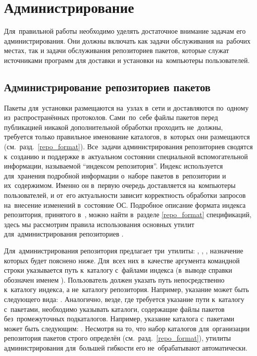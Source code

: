 
\section{Администрирование \ds}

Для~правильной работы \ds необходимо уделять достаточное внимание задачам его администрирования.
Они должны включать как задачи обслуживания \ds на~рабочих местах, так и задачи обслуживания репозиториев пакетов,
которые служат источниками программ для доставки и установки на~компьютеры пользователей.

\subsection{Администрирование репозиториев пакетов}

Пакеты для~установки размещаются на~узлах в~сети и доставляются по~одному из~распространённых протоколов.
Сами~по~себе файлы пакетов перед публикацией никакой дополнительной обработки проходить не~должны,
требуется только правильное именование каталогов, в~которых они размещаются (см.~разд.~\ref{repo_format}).
Все~задачи администрирования репозиториев сводятся к~созданию и поддержке в~актуальном состоянии специальной вспомогательной информации,
называемой ``индексом  репозитория''.
Индекс используется для~хранения подробной информации о~наборе пакетов в~репозитории и их~содержимом.
Именно он в~первую очередь доставляется  на~компьютеры пользователей,
и от~его актуальности зависит корректность обработки запросов на~внесение изменений в~состояние ОС.
Подробное описание формата индекса репозитория, принятого в~\ds, можно найти в~разделе \ref{repo_format} спецификаций,
здесь мы рассмотрим правила использования основных утилит для~администрирования репозиториев \ds.

Для~администрирования репозитория \ds  предлагает три~утилиты:
,
,
,
назначение которых будет пояснено ниже.
Для~всех них в~качестве аргумента командной строки указывается путь к~каталогу с~файлами индекса (в~выводе справки обозначен именем ).
Пользователь должен указать путь непосредственно к~каталогу индекса,
а не~каталогу репозитория. 
Например, указание может быть следующего вида: . 
Аналогично, везде, где требуется указание пути к~каталогу с~пакетами, необходимо указывать каталоги,
содержащие файлы пакетов без~промежуточных подкаталогов.
Например, указание каталога с~пакетами может быть следующим: .
Несмотря на то, что набор каталогов для~организации репозитория пакетов \ds строго определён (см.~разд.~\ref{repo_format}),
утилиты администрирования  для~большей гибкости его не~обрабатывают автоматически.

